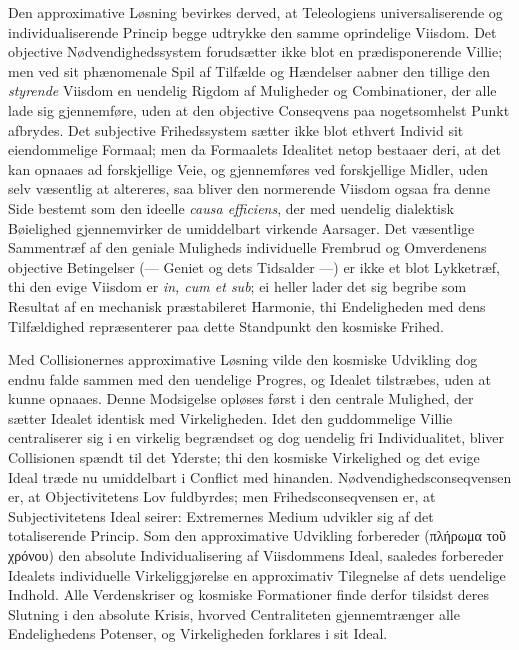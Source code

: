 \documentclass[12pt]{book}
\newcommand{\opage}[1]{\marginnote{\footnotesize\textit{[#1]}}}
\begin{document}
Den approximative Løsning bevirkes derved, at Teleologiens universaliserende og
individualiserende Princip begge udtrykke den samme oprindelige Viisdom. Det objective
Nødvendighedssystem forudsætter ikke blot en prædisponerende Villie; men ved sit
phænomenale Spil af Tilfælde og Hændelser aabner den tillige den \emph{styrende}
Viisdom en uendelig Rigdom af Muligheder og Combinationer, der alle lade sig
gjennemføre, uden at den objective Conseqvens paa nogetsomhelst Punkt afbrydes. Det
subjective Frihedssystem sætter ikke blot ethvert Individ sit eiendommelige Formaal;
\opage{246} men da Formaalets Idealitet netop bestaaer deri, at det kan opnaaes ad forskjellige
Veie, og gjennemføres ved forskjellige Midler, uden selv væsentlig at altereres, saa
bliver den normerende Viisdom ogsaa fra denne Side bestemt som den ideelle
\textit{causa efficiens}, der med uendelig dialektisk Bøielighed gjennemvirker de
umiddelbart virkende Aarsager. Det væsentlige Sammentræf af den geniale Muligheds
individuelle Frembrud og Omverdenens objective Betingelser (--- Geniet og dets
Tidsalder ---) er ikke et blot Lykketræf, thi den evige Viisdom er
\textit{in, cum et sub}; ei heller lader det sig begribe som Resultat af en mechanisk
præstabileret Harmonie, thi Endeligheden med dens Tilfældighed repræsenterer paa dette
Standpunkt den kosmiske Frihed.

Med Collisionernes approximative Løsning vilde den kosmiske Udvikling dog endnu falde
sammen med den uendelige Progres, og Idealet tilstræbes, uden at kunne opnaaes. Denne
Modsigelse opløses først i den centrale Mulighed, der sætter Idealet identisk med
Virkeligheden. Idet den guddommelige Villie centraliserer sig i en virkelig begrændset
og dog uendelig fri Individualitet, bliver Collisionen spændt til det Yderste; thi den
kosmiske Virkelighed og det evige Ideal træde nu umiddelbart i Conflict med hinanden.
Nødvendighedsconseqvensen er, at Objectivitetens Lov fuldbyrdes; men
Frihedsconseqvensen er, at Subjectivitetens Ideal seirer: Extremernes Medium udvikler
sig af det totaliserende Princip. Som den approximative Udvikling forbereder
(πλήρωμα τοῦ χρόνου) den absolute Individualisering af Viisdommens Ideal, saaledes
forbereder Idealets individuelle Virkeliggjørelse en approximativ Tilegnelse af dets
uendelige Indhold. Alle Verdenskriser og kosmiske Formationer finde derfor tilsidst
\opage{247} deres Slutning i den absolute Krisis, hvorved Centraliteten gjennemtrænger alle
Endelighedens Potenser, og Virkeligheden forklares i sit Ideal.
\end{document}
